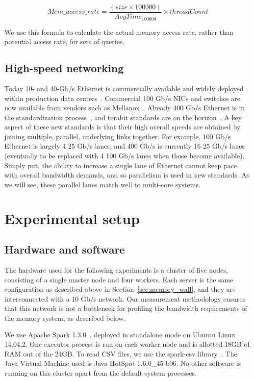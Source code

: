 \documentclass{sig-alternate-05-2015}
\begin{document}
\begin{equation}
Mem\_access\_rate =  \frac{(size \times 100000)}{AvgTime_{100000}} \times threadCount
\label{eqn:membw}
\end{equation}

We use this formula to calculate the actual memory access rate, rather than
potential access rate, for sets of queries.

\subsection{High-speed networking}

Today 10- and 40-Gb/s Ethernet is commercially available and widely deployed
within production data centers~\cite{fb-dc}.  Commercial 100 Gb/s NICs and
switches are now available from vendors such as Mellanox~\cite{mellanox100g}.
Already 400 Gb/s Ethernet is in the standardization
process~\cite{ethernet400g}, and terabit standards are on the
horizon~\cite{terabitethernet}.  A key aspect of these new standards is that
their high overall speeds are obtained by joining multiple, parallel,
underlying links together.  For example, 100 Gb/s Ethernet is largely 4 25 Gb/s
lanes, and 400 Gb/s is currently 16 25 Gb/s lanes (eventually to be replaced
with 4 100 Gb/s lanes when those become available).  Simply put, the ability to
increase a single lane of Ethernet cannot keep pace with overall bandwidth
demands, and so parallelism is used in new standards.  As we will see, these
parallel lanes match well to multi-core systems.

\section{Experimental setup}

\subsection{Hardware and software}

The hardware used for the following experiments is a cluster of five nodes,
consisting of a single master node and four workers. Each server is the same
configuration as described above in Section~\ref{sec:memory_wall}, and they are
interconnected with a 10 Gb/s network.  Our measurement methodology ensures
that this network is not a bottleneck for profiling the bandwidth requirements
of the memory system, as described below.

We use Apache Spark 1.3.0~\cite{sparkUrl}, deployed in standalone mode on
Ubuntu Linux 14.04.2.  One executor process is run on each worker node and is
allotted 18GB of RAM out of the 24GB. To read CSV files, we use the spark-csv
library~\cite{sparkCsv}. The Java Virtual Machine used is Java HotSpot
1.6.0\_45-b06.  No other software is running on this cluster apart from the
default system processes.
\end{document}
